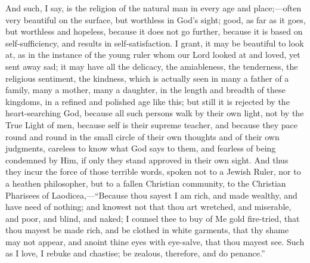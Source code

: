 And such, I say, is the religion of the natural man in
every age and place;—often very beautiful on the
surface, but worthless in God's sight; good, as far as it
goes, but worthless and hopeless, because it does not go
further, because it is based on self-sufficiency, and
results in self-satisfaction. I grant, it may be
beautiful to look at, as in the instance of the young
ruler whom our Lord looked at and loved, yet sent away
sad; it may have all the delicacy, the amiableness, the
tenderness, the religious sentiment, the kindness, which
is actually seen in many a father of a family, many a
mother, many a daughter, in the length and breadth of
these kingdoms, in a refined and polished age like this;
but still it is rejected by the heart-searching God,
because all such persons walk by their own light, not by
the True Light of men, because self is their supreme
teacher, and because they pace round and round in the
small circle of their own thoughts and of their own
judgments, careless to know what God says to them, and
fearless of being condemned by Him, if only they stand
approved in their own sight. And thus they incur the
force of those terrible words, spoken not to a Jewish
Ruler, nor to a heathen philosopher, but to a fallen
Christian community, to the Christian Pharisees of
Laodicea,—``Because thou sayest I am rich, and
made wealthy, and have need of nothing; and knowest not
that thou art wretched, and miserable, and poor, and
blind, and naked; I counsel thee to buy of Me gold
fire-tried, that thou mayest be made rich, and be clothed
in white garments, that thy shame may not appear, and
anoint thine eyes with eye-salve, that thou mayest see.
Such as I love, I rebuke and chastise; be zealous,
therefore, and do penance.''

